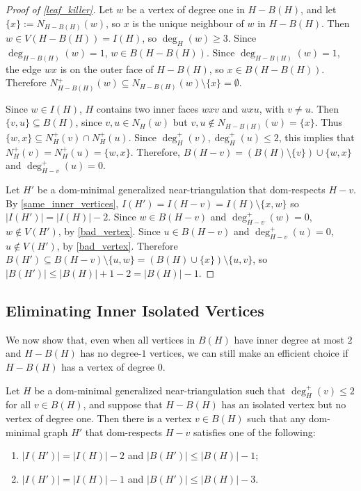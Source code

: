 \documentclass{patmorin}
\begin{document}
\begin{proof}[Proof of \cref{leaf_killer}]
Let $w$ be a vertex of degree one in $H-B(H)$, and let $\{x\}:=N_{H-B(H)}(w)$, so $x$ is the unique
neighbour of $w$ in $H-B(H)$. Then $w\in V(H-B(H))=I(H)$, so $\deg_H(w)\ge 3$.  Since $\deg_{H-B(H)}(w)=1$, $w\in B(H-B(H))$.  Since $\deg_{H-B(H)}(w)=1$, the edge $wx$ is on the outer face of $H-B(H)$, so $x\in B(H-B(H))$.  Therefore $N^+_{H-B(H)}(w)\subseteq N_{H-B(H)}(w)\setminus \{x\}=\emptyset$.

Since $w\in I(H)$, $H$ contains two inner faces $wxv$
and $wxu$, with $v\ne u$. Then $\{v,u\}\subseteq B(H)$, since $v,u\in N_H(w)$ but $v,u\not\in N_{H-B(H)}(w)=\{x\}$. Thus $\{w,x\}\subseteq N_H^+(v)\cap N_H^+(u)$. Since $\deg^+_H(v),\deg^+_H(u)\le 2$, this implies that $N_H^+(v)=N_H^+(u)=\{w,x\}$.
Therefore, $B(H-v)=(B(H)\setminus\{v\})\cup\{w,x\}$ and $\deg^+_{H-v}(u)=0$.

Let $H'$ be a dom-minimal generalized near-triangulation that dom-respects $H-v$.  By \ref{same_inner_vertices}, $I(H')=I(H-v)=I(H)\setminus\{x,w\}$ so $|I(H')|=|I(H)|-2$.  Since $w\in B(H-v)$ and $\deg^+_{H-v}(w)=0$, $w\not\in V(H')$, by \ref{bad_vertex}.  Since $u\in B(H-v)$ and $\deg^+_{H-v}(u)=0$, $u\not\in V(H')$, by \ref{bad_vertex}.  Therefore $B(H')\subseteq B(H-v)\setminus\{u,w\}=(B(H)\cup\{x\})\setminus\{u,v\}$, so $|B(H')|\le |B(H)|+1-2 = |B(H)|-1$.
\end{proof}

\subsection{Eliminating Inner Isolated Vertices}
\label{zero_kill_sec}

We now show that, even when all vertices in $B(H)$ have inner degree at most $2$ and $H-B(H)$ has no degree-$1$ vertices, we can still make an efficient choice if $H-B(H)$ has a vertex of degree $0$.

\begin{lem}\label{degree_zero_killer}
  Let $H$ be a dom-minimal generalized near-triangulation such that $\deg^+_H(v)\le 2$ for all $v\in B(H)$, and suppose that $H-B(H)$ has an isolated vertex but no vertex of degree one. Then there is a vertex $v\in B(H)$ such that any dom-minimal graph $H'$ that dom-respects $H-v$ satisfies one of the following:
\begin{enumerate}[label=\rm(\alph*),nosep,nolistsep]
\item\label{decrease_inner_by_two} $|I(H')|=|I(H)|-2$ and $|B(H')|\le|B(H)|-1$;
\item\label{decrease_boundary_by_three} $|I(H')|=|I(H)|-1$ and $|B(H')|\le|B(H)|-3$.
\end{enumerate}
\end{lem}
\end{document}
